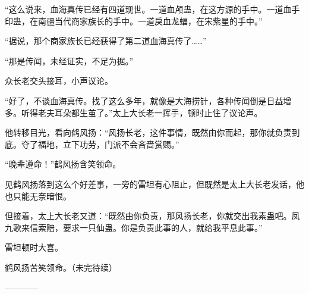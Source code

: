 \begin{this_body}
“这么说来，血海真传已经有四道现世。一道血颅蛊，在这方源的手中。一道血手印蛊，在南疆当代商家族长的手中。一道戾血龙蝠，在宋紫星的手中。”

“据说，那个商家族长已经获得了第二道血海真传了……”

“那是传闻，未经证实，不足为据。”

众长老交头接耳，小声议论。

“好了，不谈血海真传。找了这么多年，就像是大海捞针，各种传闻倒是日益增多。听得老夫耳朵都生茧了。”太上大长老一挥手，顿时止住了议论声。

他转移目光，看向鹤风扬：“风扬长老，这件事情，既然由你而起，那你就负责到底。夺了福地，立下功劳，门派不会吝啬赏赐。”

“晚辈遵命！”鹤风扬含笑领命。

见鹤风扬落到这么个好差事，一旁的雷坦有心阻止，但既然是太上大长老发话，他也只能无奈暗恨。

但接着，太上大长老又道：“既然由你负责，那风扬长老，你就交出我素蛊吧。凤九歌来信索赔，要求一只仙蛊。你是负责此事的人，就给我平息此事。”

雷坦顿时大喜。

鹤风扬苦笑领命。（未完待续）

------------

\end{this_body}

